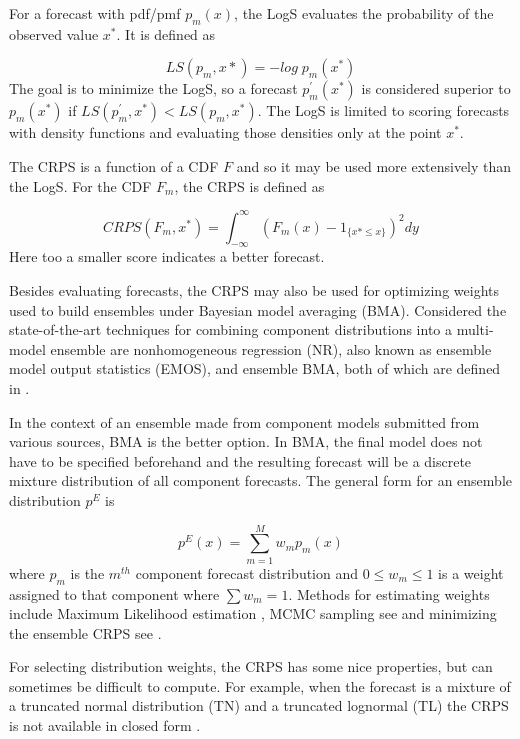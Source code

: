 \documentclass[11pt,notitlepage]{isuthesis}
\begin{document}
For a forecast with pdf/pmf $p_m(x)$, the LogS evaluates the 
probability of the observed value $x^*$. It is defined as

\begin{equation}
\label{eq:logs}
  LS(p_m,x*) = -log\;p_m(x^*)
\end{equation}
The goal is to minimize the LogS, so a forecast $p^{'}_m(x^*)$ is considered 
superior to $p_m(x^*)$ if
$LS(p^{'}_m, x^*) < LS(p_m, x^*)$.
The LogS is limited to scoring forecasts with density functions and
evaluating those densities only at the point $x^*$.

The CRPS is a function of a CDF $F$
and so it may
be used more extensively than the LogS. 
For the CDF $F_m$, the CRPS is defined as

\begin{equation}
\label{eq:crps}
  CRPS(F_m, x^*) = \int_{-\infty}^{\infty} (F_m(x)- 1_{\{x*\leq x\}})^2 dy
\end{equation}
Here too a smaller score indicates a better forecast.

Besides evaluating forecasts, the CRPS may also be used for optimizing weights 
used
to build ensembles under Bayesian model averaging (BMA). Considered the 
state-of-the-art techniques for combining 
component distributions
into a multi-model ensemble are nonhomogeneous regression (NR), also known as
ensemble model output statistics (EMOS), and ensemble
BMA, both of which are defined in \cite{gneiting2014probabilistic}.

In the context of an ensemble made from component models submitted from various
sources,
BMA is the better option. In BMA, the final model does not have to be specified
beforehand and the resulting forecast will be a discrete mixture distribution
of all component forecasts. The general form for an ensemble distribution $p^E$
is

\begin{equation}
\label{eq:bma}
  p^E(x) = \sum_{m=1}^M w_mp_m(x)
\end{equation}
where $p_m$ is the $m^{th}$ component forecast distribution and 
$0 \leq w_m \leq 1$ is a weight assigned to that component where $\sum w_m = 1$.
Methods for estimating weights include Maximum Likelihood estimation
\cite{raftery2005using}, MCMC 
sampling see \cite{vrugt2008ensemble}
and minimizing the ensemble CRPS see
\cite{baran2018combining}.

For selecting distribution weights, the CRPS has some nice properties, but can 
sometimes be
difficult to compute. For example, when the forecast is a mixture of a 
truncated normal distribution (TN) and a truncated lognormal (TL) the CRPS is 
not available in closed form \cite{baran2018combining}.
\end{document}
